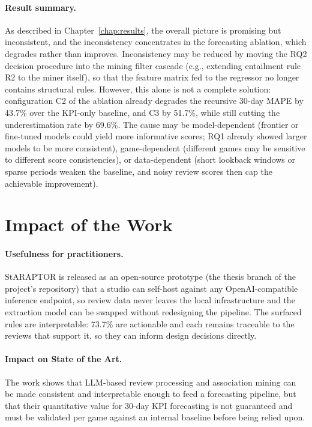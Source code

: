 \paragraph{Result summary.} As described in Chapter~\ref{chap:results}, the overall picture is promising but inconsistent, and the inconsistency concentrates in the forecasting ablation, which degrades rather than improves. Inconsistency may be reduced by moving the RQ2 decision procedure into the mining filter cascade (e.g., extending entailment rule R2 to the miner itself), so that the feature matrix fed to the regressor no longer contains structural rules. However, this alone is not a complete solution: configuration C2 of the ablation already degrades the recursive 30-day MAPE by 43.7\% over the KPI-only baseline, and C3 by 51.7\%, while still cutting the underestimation rate by 69.6\%. The cause may be model-dependent (frontier or fine-tuned models could yield more informative scores; RQ1 already showed larger models to be more consistent), game-dependent (different games may be sensitive to different score consistencies), or data-dependent (short lookback windows or sparse periods weaken the baseline, and noisy review scores then cap the achievable improvement).

\section{Impact of the Work}
\label{sec:impact}

\paragraph{Usefulness for practitioners.} StARAPTOR is released as an open-source prototype (the thesis branch of the project's repository) that a studio can self-host against any OpenAI-compatible inference endpoint, so review data never leaves the local infrastructure and the extraction model can be swapped without redesigning the pipeline. The surfaced rules are interpretable: 73.7\% are actionable and each remains traceable to the reviews that support it, so they can inform design decisions directly.

\paragraph{Impact on State of the Art.} The work shows that LLM-based review processing and association mining can be made consistent and interpretable enough to feed a forecasting pipeline, but that their quantitative value for 30-day KPI forecasting is not guaranteed and must be validated per game against an internal baseline before being relied upon.


